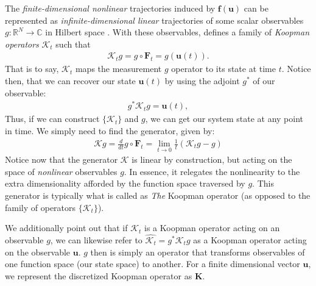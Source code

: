 The \emph{finite-dimensional nonlinear} trajectories induced by $\bm{f}(\bm{u})$ can be represented as \emph{infinite-dimensional linear} trajectories of some scalar observables $g:\mathbb{R}^N\to \mathbb{C}$ in Hilbert space \cite{koopman1931hamiltonian}. With these observables, \citet{koopman1931hamiltonian} defines a family of \emph{Koopman operators} $\bm{\mathcal{K}}_t$ such that 
\begin{align}
    \bm{\mathcal{K}}_tg = g\circ\bm{F}_t = g(\bm{u}(t)).
\end{align}
That is to say, $\bm{\mathcal{K}}_t$ maps the measurement $g$ operator to its state at time $t$. Notice then, that we can recover our state $\bm{u}(t)$ by using the adjoint $g^*$ of our observable:
\begin{align}
g^*\bm{\mathcal{K}}_t g = \bm{u}(t),
\end{align}
Thus, if we can construct $\{\bm{\mathcal{K}}_t\}$ and $g$, we can get our system state at any point in time. We simply need to find the generator, given by:
\begin{align}
    \bm{\mathcal{K}}g = \frac{d}{dt}g\circ\bm{F}_t = \lim_{t\to 0}\frac{1}{t}(\bm{\mathcal{K}}_tg-g)
\end{align} 
Notice now that the generator $\bm{\mathcal{K}}$ is linear by construction, but acting on the space of \emph{nonlinear} observables $g$. In essence, it relegates the nonlinearity to the extra dimensionality afforded by the function space traversed by $g$. This generator is typically what is called as \emph{The} Koopman operator (as opposed to the family of operators $\{\bm{\mathcal{K}}_t\}$).

We additionally point out that if $\bm{\mathcal{K}}_t$ is a Koopman operator acting on an observable $g$, we can likewise refer to $\hat{\bm{\mathcal{K}}_t}=g^*\bm{\mathcal{K}}_tg$ as a Koopman operator acting on the observable $\bm{u}$. $g$ then is simply an operator that transforms observables of one function space (our state space) to another. For a finite dimensional vector $\bm{u}$, we represent the discretized Koopman operator as $\bm{K}$.


